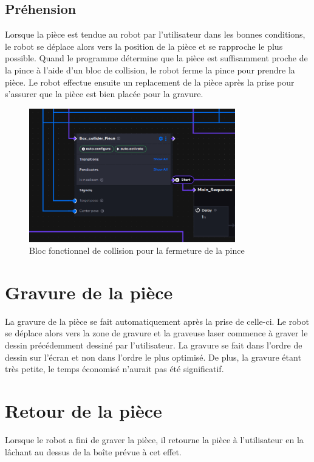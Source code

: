 \subsection{Préhension}

Lorsque la pièce est tendue au robot par l'utilisateur dans les bonnes conditions, le robot se déplace alors vers la position de la pièce et se rapproche le plus possible. Quand le programme détermine que la pièce est suffisamment proche de la pince à l'aide d'un bloc de collision, le robot ferme la pince pour prendre la pièce. Le robot effectue ensuite un replacement de la pièce après la prise pour s'assurer que la pièce est bien placée pour la gravure.

\begin{figure}[H]
    \centering
    \includegraphics[width=0.8\textwidth]{assets/figures/AICA_box_prise.png}
    \caption{Bloc fonctionnel de collision pour la fermeture de la pince}
    \label{fig:prise_piece}
\end{figure}

\section{Gravure de la pièce}

La gravure de la pièce se fait automatiquement après la prise de celle-ci. Le robot se déplace alors vers la zone de gravure et la graveuse laser commence à graver le dessin précédemment dessiné par l'utilisateur.
La gravure se fait dans l'ordre de dessin sur l'écran et non dans l'ordre le plus optimisé. De plus, la gravure étant très petite, le temps économisé n'aurait pas été significatif.

\section{Retour de la pièce}

Lorsque le robot a fini de graver la pièce, il retourne la pièce à l'utilisateur en la lâchant au dessus de la boîte prévue à cet effet.
